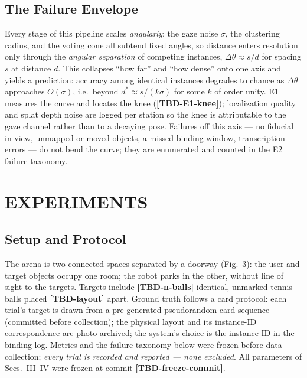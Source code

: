\documentclass[letterpaper, 10 pt, conference]{ieeeconf}  %
\newcommand{\TBD}[1]{\textbf{\color{red}[TBD-#1]}}
\begin{document}
\subsection{The Failure Envelope}
Every stage of this pipeline scales \emph{angularly}: the gaze noise
$\sigma$, the clustering radius, and the voting cone all subtend
fixed angles, so distance enters resolution only through the
\emph{angular separation} of competing instances,
$\Delta\theta \approx s/d$ for spacing $s$ at distance $d$. This
collapses ``how far'' and ``how dense'' onto one axis and yields a
prediction: accuracy among identical instances degrades to chance as
$\Delta\theta$ approaches $O(\sigma)$, i.e.\ beyond
$d^\ast \approx s/(k\sigma)$ for some $k$ of order unity. E1 measures
the curve and locates the knee (\TBD{E1-knee}); localization quality
and splat depth noise are logged per station so the knee is
attributable to the gaze channel rather than to a decaying pose.
Failures off this axis --- no fiducial in view, unmapped or moved
objects, a missed binding window, transcription errors --- do not
bend the curve; they are enumerated and counted in the E2 failure
taxonomy.


\section{EXPERIMENTS}

\subsection{Setup and Protocol}
The arena is two connected spaces separated by a doorway
(Fig.~3): the user and target objects occupy one room; the robot
parks in the other, without line of sight to the targets. Targets
include \TBD{n-balls} identical, unmarked tennis balls placed
\TBD{layout} apart. Ground truth follows a card protocol: each trial's
target is drawn from a pre-generated pseudorandom card sequence
(committed before collection); the physical layout and its
instance-ID correspondence are photo-archived; the system's choice is
the instance ID in the binding log. Metrics and the failure taxonomy
below were frozen before data collection; \emph{every trial is
recorded and reported --- none excluded}. All parameters of
Secs.~III--IV were frozen at commit \TBD{freeze-commit}.
\end{document}
